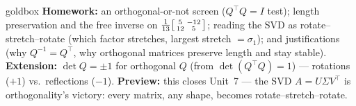 \documentclass[10pt]{article}
\newcommand{\T}{^{\top}}
\begin{document}
\begin{skillbox}{goldbox}
\textbf{Homework:} an orthogonal-or-not screen ($Q\T Q=I$ test); length preservation and the free inverse on
$\tfrac1{13}\begin{bsmallmatrix} 5 & -12\\ 12 & 5 \end{bsmallmatrix}$; reading the SVD as rotate--stretch--rotate
(which factor stretches, largest stretch $=\sigma_1$); and justifications (why $Q^{-1}=Q\T$, why orthogonal
matrices preserve length and stay stable). \textbf{Extension:} $\det Q=\pm1$ for orthogonal $Q$ (from
$\det(Q\T Q)=1$) --- rotations ($+1$) vs.\ reflections ($-1$). \textbf{Preview:} this closes Unit~7 --- the SVD
$A=U\Sigma V\T$ is orthogonality's victory: every matrix, any shape, becomes rotate--stretch--rotate.
\end{skillbox}
\end{document}
